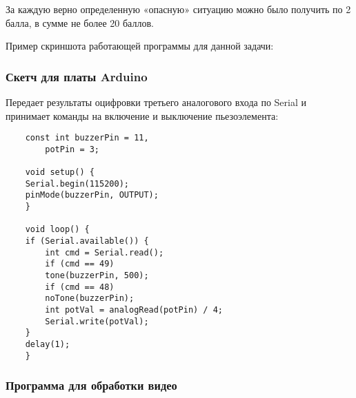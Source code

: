 За каждую верно определенную «опасную» ситуацию можно было получить по 2 балла, в сумме не более 20 баллов.

Пример скриншота работающей программы для данной задачи:


\subsubsection*{Скетч для платы Arduino}

Передает результаты оцифровки третьего аналогового входа по Serial и принимает команды на включение и выключение пьезоэлемента: 

\begin{verbatim}
    const int buzzerPin = 11,
      	potPin = 3;

    void setup() {
    Serial.begin(115200);
    pinMode(buzzerPin, OUTPUT);
    }

    void loop() {
    if (Serial.available()) {
        int cmd = Serial.read();
        if (cmd == 49)
        tone(buzzerPin, 500);
        if (cmd == 48)
        noTone(buzzerPin);
        int potVal = analogRead(potPin) / 4;
        Serial.write(potVal);
    }
    delay(1);
    }
\end{verbatim}

\subsubsection*{Программа для обработки видео}


